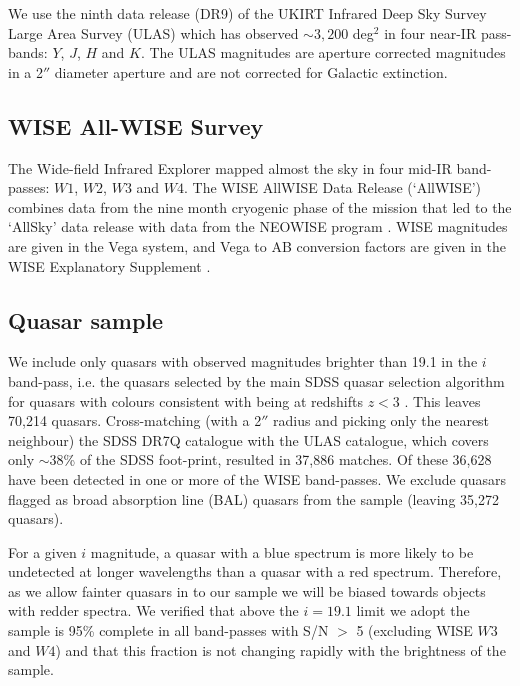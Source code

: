We use the ninth data release (DR9) of the UKIRT Infrared Deep Sky Survey \citep[UKIDSS;][]{lawrence07} Large Area Survey (ULAS) which has observed $\sim 3,200$ deg$^2$ in four near-IR pass-bands: $Y$, $J$, $H$ and $K$. 
The ULAS magnitudes are aperture corrected magnitudes in a 2$''$ diameter aperture and are not corrected for Galactic extinction.

\subsection{WISE All-WISE Survey}

The Wide-field Infrared Explorer \citep[WISE;][]{wright10} mapped almost the sky in four mid-IR band-passes: $W1$, $W2$, $W3$ and $W4$. 
The WISE AllWISE Data Release (`AllWISE') combines data from the nine month cryogenic phase of the mission that led to the `AllSky' data release with data from the NEOWISE program \citep{mainzer11}. 
WISE magnitudes are given in the Vega system, and Vega to AB conversion factors are given in the WISE Explanatory Supplement \citep{cutri13}. 

\subsection{Quasar sample}

We include only quasars with observed magnitudes brighter than 19.1 in the $i$ band-pass, i.e. the quasars selected by the main SDSS quasar selection algorithm for quasars with colours consistent with being at redshifts $z < 3$ \citep{richards02}. 
This leaves 70,214 quasars. 
Cross-matching (with a 2$''$ radius and picking only the nearest neighbour) the SDSS DR7Q catalogue with the ULAS catalogue, which covers only $\sim 38$\% of the SDSS foot-print, resulted in 37,886 matches. 
Of these 36,628 have been detected in one or more of the WISE band-passes. 
We exclude quasars flagged as broad absorption line (BAL) quasars from the sample (leaving 35,272 quasars).

For a given $i$ magnitude, a quasar with a blue spectrum is more likely to be undetected at longer wavelengths than a quasar with a red spectrum. 
Therefore, as we allow fainter quasars in to our sample we will be biased towards objects with redder spectra.
We verified that above the $i=19.1$ limit we adopt the sample is 95\% complete in all band-passes with S/N $>$ 5 (excluding WISE $W3$ and $W4$) and that this fraction is not changing rapidly with the brightness of the sample. 

